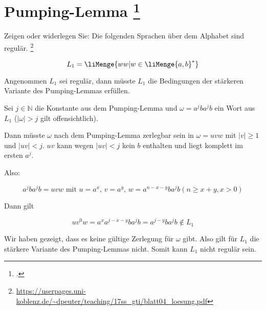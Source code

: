 \documentclass{lehramt-informatik-aufgabe}
\begin{document}
\let\m=\liMenge

\section{Pumping-Lemma
\footcite{}}

Zeigen oder widerlegen Sie: Die folgenden Sprachen über dem Alphabet
 sind regulär.
\footnote{\url{https://userpages.uni-koblenz.de/~dpeuter/teaching/17ss_gti/blatt04_loesung.pdf}}

\begin{liExkurs}
\liPumpingRegulaer
\end{liExkurs}

\begin{displaymath}
L_1 = \m{w w | w \in \m{a, b}^* }
\end{displaymath}

\begin{liAntwort}
\noindent
Angenommen $L_1$ sei regulär, dann müsste $L_1$ die Bedingungen der
stärkeren Variante des Pumping-Lemmas erfüllen.


\noindent
Sei $j \in \mathbb{N}$ die Konstante aus dem Pumping-Lemma und $\omega =
a^j b a^j b$ ein Wort aus $L_1$ ($|\omega| > j$ gilt offensichtlich).

Dann müsste $\omega$ nach dem Pumping-Lemma zerlegbar sein in $\omega =
uvw$ mit $|v| \geq 1$ und $|uv| < j$.
%
$uv$ kann wegen $|uv| < j$ kein $b$ enthalten und liegt komplett im
ersten $a^j$.

\noindent
Also:

\begin{displaymath}
a^j b a^j b = uvw \text{ mit }
u = a^x \text{, }
v = a^y \text{, }
w = a^{n - x - y} b a^j b (n \geq x + y, x > 0)
\end{displaymath}

\noindent
Dann gilt

\begin{displaymath}
u v^0 w = a^x a^{j - x - y} b a^j b = a^{j - y} b a^j b \notin L_1
\end{displaymath}

\noindent
Wir haben gezeigt, dass es keine gültige Zerlegung für $\omega$ gibt.
Also gilt für $L_1$ die stärkere Variante des Pumping-Lemmas nicht.
Somit kann $L_1$ nicht regulär sein.
\end{liAntwort}
\end{document}
